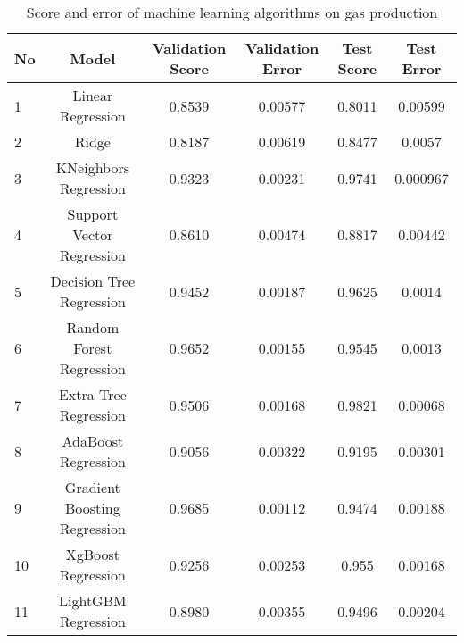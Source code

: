 \documentclass[english]{article}
\begin{document}
\begin{appendices}
\begin{table}[H]
\centering
\caption{Score and error of machine learning algorithms on gas production}
\begin{tabular}{|l|c|c|c|c|c|}
\hline
\textbf{No} & \textbf{Model}               & \textbf{Validation Score} & \textbf{Validation Error} & \textbf{Test Score} & \textbf{Test Error} \\ \hline
1           & Linear Regression            & 0.8539                    & 0.00577                   & 0.8011              & 0.00599             \\ \hline
2           & Ridge                        & 0.8187                    & 0.00619                   & 0.8477              & 0.0057              \\ \hline
3           & KNeighbors Regression        & 0.9323                    & 0.00231                   & 0.9741              & 0.000967            \\ \hline
4           & Support Vector Regression    & 0.8610                    & 0.00474                   & 0.8817              & 0.00442             \\ \hline
5           & Decision Tree Regression     & 0.9452                    & 0.00187                   & 0.9625              & 0.0014              \\ \hline
6           & Random Forest Regression     & 0.9652                    & 0.00155                   & 0.9545              & 0.0013              \\ \hline
7           & Extra Tree Regression        & 0.9506                    & 0.00168                   & 0.9821              & 0.00068             \\ \hline
8           & AdaBoost Regression          & 0.9056                    & 0.00322                   & 0.9195              & 0.00301             \\ \hline
9           & Gradient Boosting Regression & 0.9685                    & 0.00112                   & 0.9474              & 0.00188             \\ \hline
10          & XgBoost Regression           & 0.9256                    & 0.00253                   & 0.955               & 0.00168             \\ \hline
11          & LightGBM Regression          & 0.8980                    & 0.00355                   & 0.9496              & 0.00204             \\ \hline
\end{tabular}
\end{table}





\end{appendices}
\end{document}
